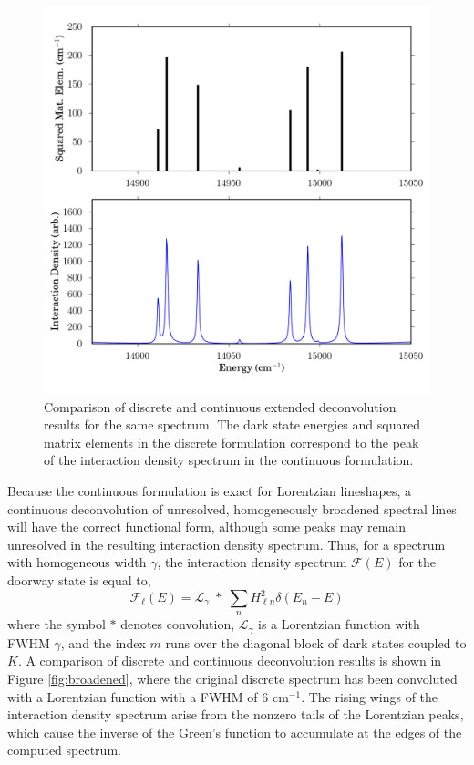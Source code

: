 \documentclass[12pt]{mitthesis}
\begin{document}
\begin{figure}
  \caption{Comparison of discrete and continuous extended
    deconvolution results for the same spectrum.  The dark state
    energies and squared matrix elements in the discrete formulation
    correspond to the peak of the interaction density spectrum in the
    continuous formulation.}
  \label{fig:compare-dark}
  \centering
  \includegraphics[width=6in]{smalley-compare-fwhm1.png}
\end{figure}

Because the continuous formulation is exact for Lorentzian lineshapes,
a continuous deconvolution of unresolved, homogeneously broadened
spectral lines will have the correct functional form, although some
peaks may remain unresolved in the resulting interaction density
spectrum.  Thus, for a spectrum with homogeneous width $\gamma$, the
interaction density spectrum $\mathcal{F}(E)$ for the doorway state is
equal to,
\begin{equation}
  \mathcal{F}_{\ell}(E) = 
    \mathcal{L}_{\gamma} \; * \;
    \sum_n H_{\ell n}^2 \delta(E_n - E)
\end{equation}
where the symbol $*$ denotes convolution, $\mathcal{L}_{\gamma}$ is a
Lorentzian function with FWHM $\gamma$, and the index $m$ runs over
the diagonal block of dark states coupled to $K$.  A comparison of
discrete and continuous deconvolution results is shown in Figure
\ref{fig:broadened}, where the original discrete spectrum has been
convoluted with a Lorentzian function with a FWHM of 6 cm$^{-1}$.  The
rising wings of the interaction density spectrum arise from the
nonzero tails of the Lorentzian peaks, which cause the inverse of the
Green's function to accumulate at the edges of the computed spectrum.
\end{document}
